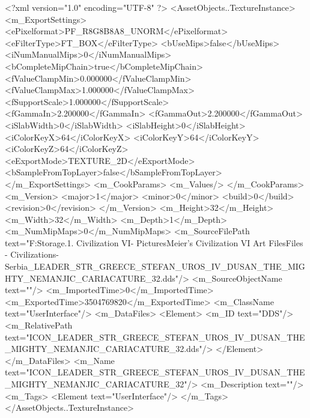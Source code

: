 <?xml version="1.0" encoding="UTF-8" ?>
<AssetObjects..TextureInstance>
	<m_ExportSettings>
		<ePixelformat>PF_R8G8B8A8_UNORM</ePixelformat>
		<eFilterType>FT_BOX</eFilterType>
		<bUseMips>false</bUseMips>
		<iNumManualMips>0</iNumManualMips>
		<bCompleteMipChain>true</bCompleteMipChain>
		<fValueClampMin>0.000000</fValueClampMin>
		<fValueClampMax>1.000000</fValueClampMax>
		<fSupportScale>1.000000</fSupportScale>
		<fGammaIn>2.200000</fGammaIn>
		<fGammaOut>2.200000</fGammaOut>
		<iSlabWidth>0</iSlabWidth>
		<iSlabHeight>0</iSlabHeight>
		<iColorKeyX>64</iColorKeyX>
		<iColorKeyY>64</iColorKeyY>
		<iColorKeyZ>64</iColorKeyZ>
		<eExportMode>TEXTURE_2D</eExportMode>
		<bSampleFromTopLayer>false</bSampleFromTopLayer>
	</m_ExportSettings>
	<m_CookParams>
		<m_Values/>
	</m_CookParams>
	<m_Version>
		<major>1</major>
		<minor>0</minor>
		<build>0</build>
		<revision>0</revision>
	</m_Version>
	<m_Height>32</m_Height>
	<m_Width>32</m_Width>
	<m_Depth>1</m_Depth>
	<m_NumMipMaps>0</m_NumMipMaps>
	<m_SourceFilePath text="F:\Mod Storage\2.1. Civilization VI\Mods\Archive - Pictures\Sid Meier's Civilization VI Art Files\Art Files - Civilizations\Civilization - Serbia\ICON_LEADER_STR_GREECE_STEFAN_UROS_IV_DUSAN_THE_MIGHTY_NEMANJIC_CARIACATURE_32.dds"/>
	<m_SourceObjectName text=""/>
	<m_ImportedTime>0</m_ImportedTime>
	<m_ExportedTime>3504769820</m_ExportedTime>
	<m_ClassName text="UserInterface"/>
	<m_DataFiles>
		<Element>
			<m_ID text="DDS"/>
			<m_RelativePath text="ICON_LEADER_STR_GREECE_STEFAN_UROS_IV_DUSAN_THE_MIGHTY_NEMANJIC_CARIACATURE_32.dds"/>
		</Element>
	</m_DataFiles>
	<m_Name text="ICON_LEADER_STR_GREECE_STEFAN_UROS_IV_DUSAN_THE_MIGHTY_NEMANJIC_CARIACATURE_32"/>
	<m_Description text=""/>
	<m_Tags>
		<Element text="UserInterface"/>
	</m_Tags>
</AssetObjects..TextureInstance>


